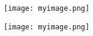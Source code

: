 \documentclass[]{article}
\begin{document}
\texttt{[image: myimage.png]}

\texttt{[image: myimage.png]}
\end{document}

